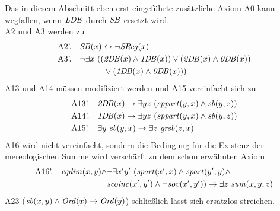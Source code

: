 %
Das in diesem Abschnitt eben erst eingeführte zusätzliche Axiom A0 kann wegfallen, wenn $\mathit{LDE}$ durch $\mathit{S\hspace*{-0.25ex}B}$ ersetzt wird.\\
%
A2 und A3 werden zu
\begin{align*}
 &\text{A2'.} \quad \GSB(x) \leftrightarrow \neg \GSReg(x)\\
 &\text{A3'.} \quad \neg \exists x\ ((\GtwoDB(x) \wedge \GoneDB(x)) \vee (\GtwoDB(x) \wedge \GzeroDB(x))\\
 &\phantom{\text{A3'.} \quad \neg \exists x\ ((} \vee (\GoneDB(x) \wedge \GzeroDB(x)))
\end{align*}
%
A13 und A14 müssen modifiziert werden und A15 vereinfacht sich zu
\begin{align*}
 &\text{A13'.} \quad \mathit{2D\hspace*{-0.25ex} B}(x) \to \exists yz\ (\mathit{sppart}(y,x) \wedge \mathit{sb}(y,z))\\
 &\text{A14'.} \quad \mathit{1D\hspace*{-0.25ex} B}(x) \to \exists yz\ (\mathit{sppart}(y,x) \wedge \mathit{sb}(y,z))\\
 &\text{A15'.} \quad \exists y\ \mathit{sb}(y,x) \to \exists z\ \mathit{gr\hspace*{-0.25ex}sb}(z,x)
\end{align*}
%
A16 wird nicht vereinfacht, sondern die Bedingung für die Existenz der mereologischen Summe wird verschärft zu dem schon erwähnten Axiom
\begin{align*}
 \text{A16'.} \quad \Geqdim(x,y) \wedge &\neg \exists x'y'\ (\Gspart(x',x) \wedge \Gspart(y',y) \wedge \\
 &\Gscoinc(x',y') \wedge \neg \Gsov(x',y')) \to \exists z\ \Gsum(x,y,z)
\end{align*}
%
A23 ($\mathit{sb}(x,y) \wedge \mathit{Ord}(x) \to \mathit{Ord}(y)$) schließlich lässt sich ersatzlos streichen.
